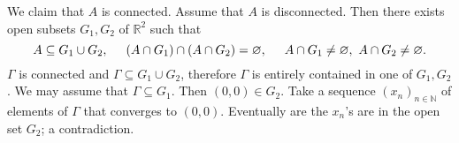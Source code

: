\documentclass[twocolumn,10pt]{article}
\begin{document}
We claim that $A$ is connected. Assume that $A$ is disconnected. Then there exists open subsets $G_1,G_2$ of $\mathbb{R}^2$ such that
\begin{equation*}
    A\subseteq G_1\cup G_2, \hspace{0.5cm} (A\cap G_1)\cap(A\cap G_2)=\varnothing, \hspace{0.5cm} A\cap G_1\neq\varnothing, \text{ } A\cap G_2\neq\varnothing.
\end{equation*}
$\Gamma$ is connected and $\Gamma\subseteq G_1\cup G_2$, therefore $\Gamma$ is entirely contained in one of $G_1,G_2$. We may assume that $\Gamma\subseteq G_1$. Then $(0,0)\in G_2$. Take a sequence $(x_n)_{n\in\mathbb{N}}$ of elements of $\Gamma$ that converges to $(0,0)$. Eventually are the $x_n$'s are in the open set $G_2$; a contradiction.
\color{black}
\end{document}
